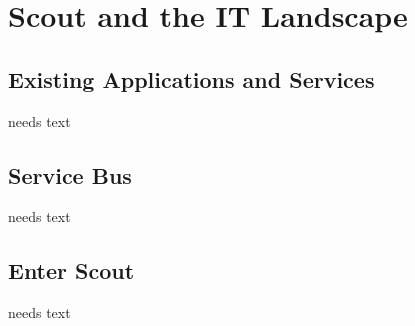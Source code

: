 \documentclass[a4paper,10pt,twoside]{book}
\begin{document}
\chapter{Scout and the IT Landscape}

\section{Existing Applications and Services}
needs text

\section{Service Bus}
needs text

\section{Enter Scout}
needs text



\ifx\wholebook\relax\else
   
   
\end{document}
